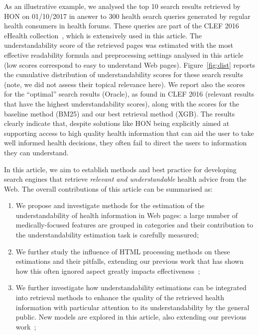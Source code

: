 \documentclass[10pt,a4paper]{article}
\begin{document}
As an illustrative example, we analysed the top 10 search results retrieved by HON on 01/10/2017 in answer to 300 health search queries generated by regular health consumers in health forums.
These queries are part of the CLEF 2016 eHealth collection~\cite{clef16}, which is extensively used in this article. 
The understandability score of the retrieved pages was estimated with the most effective readability formula and preprocessing settings analysed in this article (low scores correspond to easy to understand Web pages).
Figure~\ref{fig:dist} reports the cumulative distribution of understandability scores for these search results (note, we did not assess their topical relevance here). 
We report also the scores for the ``optimal'' search results (Oracle), as found in CLEF 2016 (relevant results that have the highest understandability scores), along with the scores for the baseline method (BM25) and our best retrieval method (XGB). 
The results clearly indicate that, despite solutions like HON being explicitly aimed at supporting access to high quality health information that can aid the user to take well informed health decisions, they often fail to direct the users to information they can understand.

In this article, we aim to establish methods and best practice for developing search engines that retrieve \textit{relevant and understandable} health advice from the Web. The overall contributions of this article can be summarised as:
\begin{enumerate}
	\item We propose and investigate methods for the estimation of the understandability of health information in Web pages: a large number of medically-focused features are grouped in categories and their contribution to the understandability estimation task is carefully measured;
	\item We further study the influence of HTML processing methods on these estimations and their pitfalls, extending our previous work that has shown how this often ignored aspect greatly impacts effectiveness~\cite{palotti15};
	\item We further investigate how understandability estimations can be integrated into retrieval methods to enhance the quality of the retrieved health information with particular attention to its understandability by the general public. New models are explored in this article, also extending our previous work~\cite{palotti2016ranking};
\end{enumerate}
\end{document}
